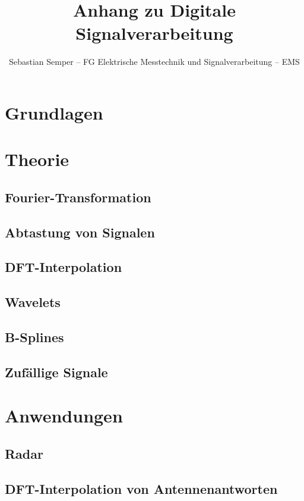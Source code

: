 \documentclass[ngerman]{article}
\title{Anhang zu Digitale Signalverarbeitung}
\author{Sebastian Semper -- FG Elektrische Messtechnik und Signalverarbeitung -- EMS}
\begin{document}

%
%
\section{Grundlagen}
%

%
%
\section{Theorie}
%
%
\subsection{Fourier-Transformation}\label{fourier}
%

%
%
\subsection{Abtastung von Signalen}\label{sampling}
%

%
%
\subsection{DFT-Interpolation}\label{dftintp}
%

%
%
\subsection{Wavelets}\label{wavelets}
%
%
\subsection{B-Splines}\label{bsplines}
%

%
%
\subsection{Zuf\"allige Signale}
%

%
%
\section{Anwendungen}
%
%
\subsection{Radar}\label{radar}
%
%
\subsection{DFT-Interpolation von Antennenantworten}\label{eadf}
%

%
%
%

\end{document}
